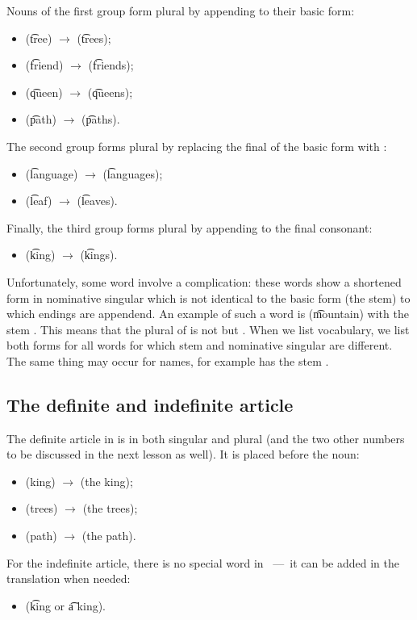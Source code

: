 Nouns of the first group form plural by appending  to their basic form:
\begin{itemize}
  \item {} (\t{tree}) $\rightarrow$  (\t{trees});
  \item {} (\t{friend}) $\rightarrow$  (\t{friends});
  \item {} (\t{queen}) $\rightarrow$  (\t{queens});
  \item {} (\t{path}) $\rightarrow$  (\t{paths}).
\end{itemize}
The second group forms plural by replacing the final  of the basic form
with :
\begin{itemize}
  \item {} (\t{language}) $\rightarrow$  (\t{languages});
  \item {} (\t{leaf}) $\rightarrow$  (\t{leaves}).
\end{itemize}
Finally, the third group forms plural by appending  to the final
consonant:
\begin{itemize}
  \item {} (\t{king}) $\rightarrow$  (\t{kings}).
\end{itemize}
Unfortunately, some word involve a complication: these words show a shortened
form in nominative singular which is not identical to the basic form (the stem)
to which endings are appendend. An example of such a word is 
(\t{mountain}) with the stem .
This means that the plural of  is not  but .
When we list vocabulary, we list both forms for all words for which stem and
nominative singular are different. The same thing may occur for names, for
example  has the stem .

\subsection{The definite and indefinite article}
The definite article in \quenya is  in both singular and plural (and the
two other numbers to be discussed in the next lesson as well).
It is placed before the noun:
\begin{itemize}
  \item {} (king) $\rightarrow$  (the king);
  \item {} (trees) $\rightarrow$  (the trees);
  \item {} (path) $\rightarrow$  (the path).
\end{itemize}
For the indefinite article, there is no special word in \quenya~---~it can be
added in the translation when needed:
\begin{itemize}
  \item {} (\t{king} or \t{a king}).
\end{itemize}


